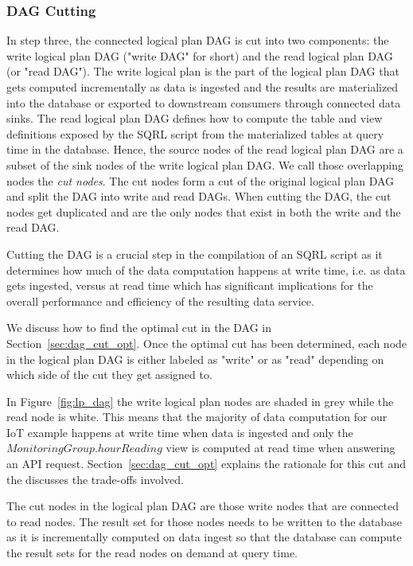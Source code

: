 \documentclass[	DIV=calc,%
							paper=letter,%
							fontsize=11pt,%
							twocolumn]{scrartcl}	 					%
\begin{document}
\subsubsection{DAG Cutting}
\label{sec:dag_cut}

In step three, the connected logical plan DAG is cut into two components: the write logical plan DAG ("write DAG" for short) and the read logical plan DAG (or "read DAG"). The write logical plan is the part of the logical plan DAG that gets computed incrementally as data is ingested and the results are materialized into the database or exported to downstream consumers through connected data sinks. The read logical plan DAG defines how to compute the table and view definitions exposed by the SQRL script from the materialized tables at query time in the database.
Hence, the source nodes of the read logical plan DAG are a subset of the sink nodes of the write logical plan DAG. We call those overlapping nodes the \emph{cut nodes}. The cut nodes form a cut of the original logical plan DAG and split the DAG into write and read DAGs. When cutting the DAG, the cut nodes get duplicated and are the only nodes that exist in both the write and the read DAG.

Cutting the DAG is a crucial step in the compilation of an SQRL script as it determines how much of the data computation happens at write time, i.e. as data gets ingested, versus at read time which has significant implications for the overall performance and efficiency of the resulting data service.

We discuss how to find the optimal cut in the DAG in Section~\ref{sec:dag_cut_opt}. Once the optimal cut has been determined, each node in the logical plan DAG is either labeled as "write" or as "read" depending on which side of the cut they get assigned to.

In Figure~\ref{fig:lp_dag} the write logical plan nodes are shaded in grey while the read node is white. This means that the majority of data computation for our IoT example happens at write time when data is ingested and only the $MonitoringGroup.hourReading$ view is computed at read time when answering an API request. Section~\ref{sec:dag_cut_opt} explains the rationale for this cut and the discusses the trade-offs involved.

The cut nodes in the logical plan DAG are those write nodes that are connected to read nodes. The result set for those nodes needs to be written to the database as it is incrementally computed on data ingest so that the database can compute the result sets for the read nodes on demand at query time.
\end{document}

